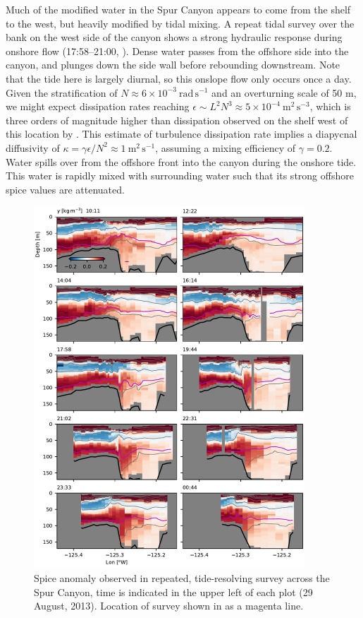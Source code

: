 \documentclass[draft]{agujournal2019}
\begin{document}
Much of the modified water in the Spur Canyon appears to come from the shelf to the west, but heavily modified by tidal mixing. A repeat tidal survey over the bank on the west side of the canyon shows a strong hydraulic response during onshore flow (17:58--21:00, ).  Dense water passes from the offshore side into the canyon, and plunges down the side wall before rebounding downstream.  Note that the tide here is largely diurnal, so this onslope flow only occurs once a day.  Given the stratification of $N\approx 6\times10^{-3} \ \mathrm{rad\,s^{-1}}$ and an overturning scale of 50 m, we might expect dissipation rates reaching $\epsilon \sim L^2N^{3} \approx 5\times10^{-4}\ \mathrm{m^2\,s^{-3}}$, which is three orders of magnitude higher than dissipation observed on the shelf west of this location by .  This estimate of turbulence dissipation rate implies a diapycnal diffusivity of $\kappa = \gamma \epsilon / N^2 \approx 1\ \mathrm{m^2\,s^{-1}}$, assuming a mixing efficiency of $\gamma=0.2$. Water spills over from the offshore front into the canyon during the onshore tide.  This water is rapidly mixed with surrounding water such that its strong offshore spice values are attenuated.

\begin{figure}[htbp]
  \begin{center}
    \includegraphics[width=4in]{HydraulicsCanyon}
    \caption{Spice anomaly observed in repeated, tide-resolving survey across the Spur Canyon, time is indicated in the upper left of each plot (29 August, 2013).   Location of survey shown in  as a magenta line.
      \label{fig:HydraulicsCanyon}
    }
  \end{center}
\end{figure}
\end{document}
